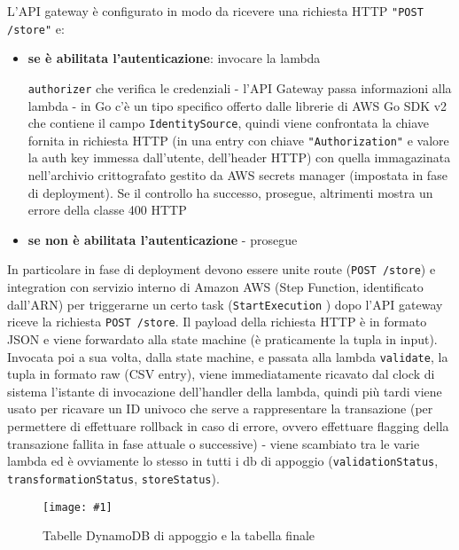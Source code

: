 \documentclass[
    sigconf, 
    screen=false, 
    acmthm=false, 
    nonacm
]{acmart}
\def\maxpicwidth{8.15cm}
\newcommand{\pichere}[3] {
\begin{figure}[H]
\centering
\texttt{[image: \#1]}
\caption{#3}
\end{figure}
}
\begin{document}
L'API gateway è configurato in modo da ricevere una richiesta HTTP \texttt{"POST /store"} e:
\begin{itemize}
    \item \textbf{se è abilitata l'autenticazione}: invocare la lambda 
    
    \texttt{authorizer} che verifica le credenziali -
    l'API Gateway passa informazioni alla lambda - in Go c'è un tipo specifico offerto dalle librerie di AWS Go 
    SDK v2 che contiene il campo \texttt{IdentitySource}, quindi viene confrontata la chiave fornita in richiesta HTTP 
    (in una entry con chiave \texttt{"Authorization"} e valore la auth key immessa dall'utente, dell'header HTTP) con quella 
    immagazinata nell'archivio crittografato gestito da AWS secrets manager (impostata in fase di deployment).
    Se il controllo ha successo, prosegue, altrimenti mostra un errore della classe 400 HTTP
    \item \textbf{se non è abilitata l'autenticazione} - prosegue
\end{itemize}
In particolare in fase di deployment devono essere unite route (\texttt{POST /store}) e integration con servizio interno
di Amazon AWS (Step Function, identificato dall'ARN) per triggerarne un certo task (\texttt{StartExecution} 
\cite{awsstartexecution}) dopo l'API gateway riceve la richiesta \texttt{POST /store}.
Il payload della richiesta HTTP è in formato JSON e viene forwardato alla state machine (è praticamente la tupla in 
input).
Invocata poi a sua volta, dalla state machine, e passata alla lambda \texttt{validate}, la tupla in formato raw 
(CSV entry), viene immediatamente ricavato dal
clock di sistema l'istante di invocazione dell'handler della lambda, quindi più tardi viene usato per ricavare 
un ID univoco che serve a rappresentare la transazione (per permettere di effettuare rollback in caso di errore, 
ovvero effettuare flagging della transazione fallita in fase attuale o successive) - viene scambiato tra le varie 
lambda ed è ovviamente lo
stesso in tutti i db di appoggio (\texttt{validationStatus}, \texttt{transformationStatus}, \texttt{storeStatus}).

\pichere{all-tables}{3.75cm}{Tabelle DynamoDB di appoggio e la tabella finale}
\end{document}
